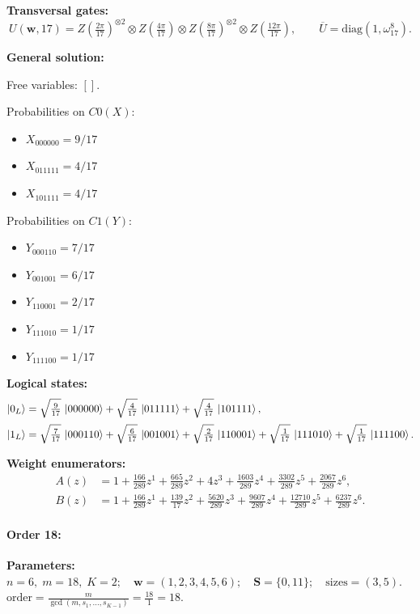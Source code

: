 \documentclass[11pt]{article}
\begin{document}
\noindent\textbf{Transversal gates:}
\[
    U(\mathbf w,17)=Z \left(\tfrac{2\pi}{17}\right)^{\otimes2} \otimes Z \left(\tfrac{4\pi}{17}\right) \otimes Z \left(\tfrac{8\pi}{17}\right)^{\otimes2} \otimes Z \left(\tfrac{12\pi}{17}\right),\qquad
    \overline U=\mathrm{diag}(1,\omega_{17}^{8}).
\]

\noindent\textbf{General solution:}

Free variables: $[]$.

Probabilities on $C0 (X)$:
\begin{itemize}
    \item $X_{000000} = 9/17$
    \item $X_{011111} = 4/17$
    \item $X_{101111} = 4/17$
\end{itemize}

Probabilities on $C1 (Y)$:
\begin{itemize}
    \item $Y_{000110} = 7/17$
    \item $Y_{001001} = 6/17$
    \item $Y_{110001} = 2/17$
    \item $Y_{111010} = 1/17$
    \item $Y_{111100} = 1/17$
\end{itemize}

\noindent\textbf{Logical states:}
\begin{align*}
\ket{0_L} &= \sqrt{\tfrac{9}{17}}\,\ket{000000} + \sqrt{\tfrac{4}{17}}\,\ket{011111} + \sqrt{\tfrac{4}{17}}\,\ket{101111},
\\[2pt]
\ket{1_L} &= \sqrt{\tfrac{7}{17}}\,\ket{000110} + \sqrt{\tfrac{6}{17}}\,\ket{001001} + \sqrt{\tfrac{2}{17}}\,\ket{110001} + \sqrt{\tfrac{1}{17}}\,\ket{111010} + \sqrt{\tfrac{1}{17}}\,\ket{111100}.
\end{align*}

\noindent\textbf{Weight enumerators:}
\begin{align*}
A(z) &= 1 + \tfrac{166}{289}z^{1} + \tfrac{665}{289}z^{2} + 4z^{3} + \tfrac{1603}{289}z^{4} + \tfrac{3302}{289}z^{5} + \tfrac{2067}{289}z^{6},\\[2pt]
B(z) &= 1 + \tfrac{166}{289}z^{1} + \tfrac{139}{17}z^{2} + \tfrac{5620}{289}z^{3} + \tfrac{9607}{289}z^{4} + \tfrac{12710}{289}z^{5} + \tfrac{6237}{289}z^{6}.
\end{align*}

\paragraph{\textbf{Order 18:}}
\noindent\textbf{Parameters:} $n=6,\; m=18,\; K=2;\quad \mathbf w=(1, 2, 3, 4, 5, 6);\quad \mathbf S=\{0, 11\};\quad \text{sizes}=\left(3, 5\right).$ $\displaystyle \text{order}=\frac{m}{\gcd(m,s_1,\dots,s_{K-1})}=\frac{18}{1}=18.$
\end{document}
